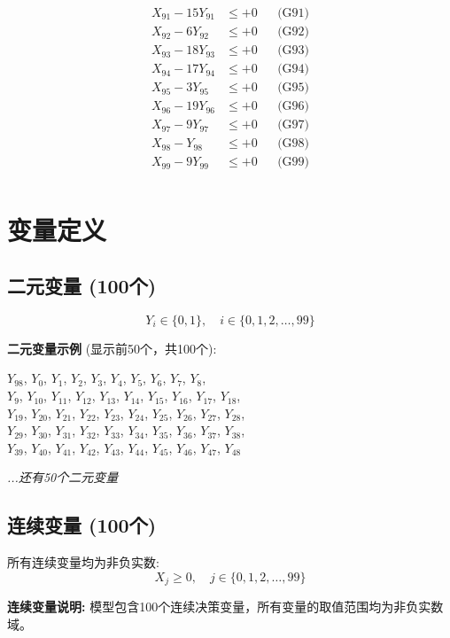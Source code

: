 \documentclass[a4paper,10pt]{article}
\begin{document}
{\begin{align}
X_{91} - 15Y_{91} &\leq +0 && \text{(G91)} \\
X_{92} - 6Y_{92} &\leq +0 && \text{(G92)} \\
X_{93} - 18Y_{93} &\leq +0 && \text{(G93)} \\
X_{94} - 17Y_{94} &\leq +0 && \text{(G94)} \\
X_{95} - 3Y_{95} &\leq +0 && \text{(G95)} \\
X_{96} - 19Y_{96} &\leq +0 && \text{(G96)} \\
X_{97} - 9Y_{97} &\leq +0 && \text{(G97)} \\
X_{98} - Y_{98} &\leq +0 && \text{(G98)} \\
X_{99} - 9Y_{99} &\leq +0 && \text{(G99)} \\
\end{align}
}

\section{变量定义}

\subsection{二元变量 (100个)}

\begin{equation}
Y_i \in \{0,1\}, \quad i \in \{0, 1, 2, \ldots, 99\}
\end{equation}

\textbf{二元变量示例} (显示前50个，共100个):

{\small
$Y_{98}$, $Y_{0}$, $Y_{1}$, $Y_{2}$, $Y_{3}$, $Y_{4}$, $Y_{5}$, $Y_{6}$, $Y_{7}$, $Y_{8}$, \\
$Y_{9}$, $Y_{10}$, $Y_{11}$, $Y_{12}$, $Y_{13}$, $Y_{14}$, $Y_{15}$, $Y_{16}$, $Y_{17}$, $Y_{18}$, \\
$Y_{19}$, $Y_{20}$, $Y_{21}$, $Y_{22}$, $Y_{23}$, $Y_{24}$, $Y_{25}$, $Y_{26}$, $Y_{27}$, $Y_{28}$, \\
$Y_{29}$, $Y_{30}$, $Y_{31}$, $Y_{32}$, $Y_{33}$, $Y_{34}$, $Y_{35}$, $Y_{36}$, $Y_{37}$, $Y_{38}$, \\
$Y_{39}$, $Y_{40}$, $Y_{41}$, $Y_{42}$, $Y_{43}$, $Y_{44}$, $Y_{45}$, $Y_{46}$, $Y_{47}$, $Y_{48}$

\textit{...还有50个二元变量}
}

\subsection{连续变量 (100个)}

所有连续变量均为非负实数:
\begin{equation}
X_j \geq 0, \quad j \in \{0, 1, 2, \ldots, 99\}
\end{equation}

\textbf{连续变量说明:} 模型包含100个连续决策变量，所有变量的取值范围均为非负实数域。
\end{document}
